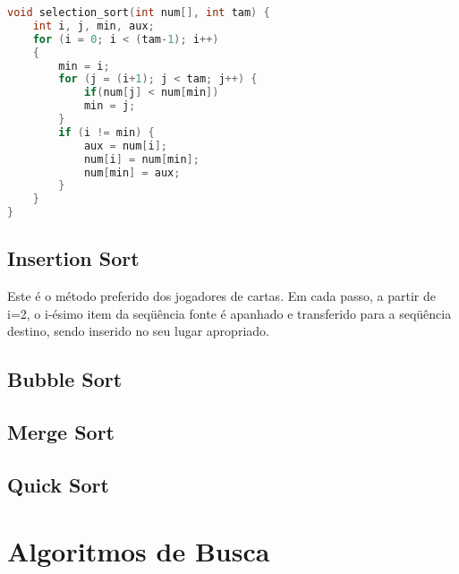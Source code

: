 \documentclass[10pt,a4paper]{article}
\begin{document}
\begin{lstlisting}[language=C++, caption={Selection Sort implemetação}]
void selection_sort(int num[], int tam) { 
	int i, j, min, aux;
  	for (i = 0; i < (tam-1); i++) 
  	{
     	min = i;
     	for (j = (i+1); j < tam; j++) {
       		if(num[j] < num[min]) 
         	min = j;
     	}
     	if (i != min) {
       		aux = num[i];
       		num[i] = num[min];
       		num[min] = aux;
     	}
  	}
}
\end{lstlisting}
\subsection{Insertion Sort}
Este é o método  preferido dos jogadores de cartas. Em cada passo, a partir de i=2, o i-ésimo item da  seqüência fonte  é apanhado e transferido para a seqüência destino, sendo inserido no seu lugar apropriado.
\subsection{Bubble Sort}
\subsection{Merge Sort}
\subsection{Quick Sort}


\section{Algoritmos de Busca}
\end{document}
